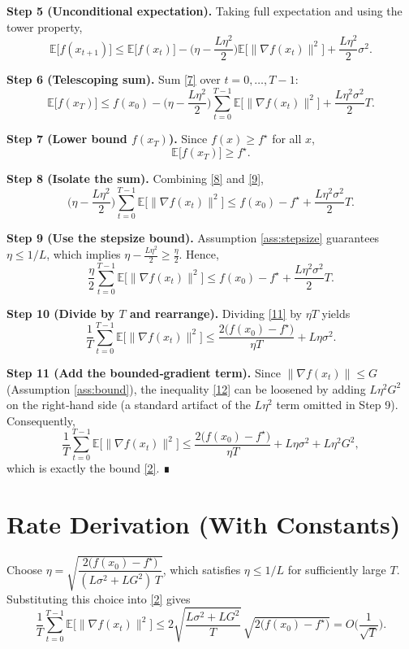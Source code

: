 \documentclass{article}
\newcommand{\E}{\mathbb{E}}
\begin{document}
\noindent\textbf{Step 5 (Unconditional expectation).}  
Taking full expectation and using the tower property,
\[
\E\big[f(x_{t+1})\big]
\le \E\big[f(x_{t})\big]
   -\Big(\eta-\frac{L\eta^{2}}{2}\Big)\E\big[\|\nabla f(x_{t})\|^{2}\big]
   +\frac{L\eta^{2}}{2}\sigma^{2}.
\tag{7}
\]

\noindent\textbf{Step 6 (Telescoping sum).}  
Sum \eqref{7} over $t=0,\dots,T-1$:
\[
\E\big[f(x_{T})\big]
\le f(x_{0})
   -\Big(\eta-\frac{L\eta^{2}}{2}\Big)\sum_{t=0}^{T-1}
        \E\big[\|\nabla f(x_{t})\|^{2}\big]
   +\frac{L\eta^{2}\sigma^{2}}{2}T.
\tag{8}
\]

\noindent\textbf{Step 7 (Lower bound $f(x_{T})$).}  
Since $f(x)\ge f^{\star}$ for all $x$,
\[
\E\big[f(x_{T})\big]\ge f^{\star}.
\tag{9}
\]

\noindent\textbf{Step 8 (Isolate the sum).}  
Combining \eqref{8} and \eqref{9},
\[
\Big(\eta-\frac{L\eta^{2}}{2}\Big)\sum_{t=0}^{T-1}
        \E\big[\|\nabla f(x_{t})\|^{2}\big]
\le f(x_{0})-f^{\star}
   +\frac{L\eta^{2}\sigma^{2}}{2}T.
\tag{10}
\]

\noindent\textbf{Step 9 (Use the stepsize bound).}  
Assumption \ref{ass:stepsize} guarantees $\eta\le 1/L$, which implies
$\eta-\frac{L\eta^{2}}{2}\ge \frac{\eta}{2}$. Hence,
\[
\frac{\eta}{2}\sum_{t=0}^{T-1}
        \E\big[\|\nabla f(x_{t})\|^{2}\big]
\le f(x_{0})-f^{\star}
   +\frac{L\eta^{2}\sigma^{2}}{2}T.
\tag{11}
\]

\noindent\textbf{Step 10 (Divide by $T$ and rearrange).}  
Dividing \eqref{11} by $\eta T$ yields
\[
\frac{1}{T}\sum_{t=0}^{T-1}
        \E\big[\|\nabla f(x_{t})\|^{2}\big]
\le \frac{2\big(f(x_{0})-f^{\star}\big)}{\eta T}
   +L\eta\sigma^{2}.
\tag{12}
\]

\noindent\textbf{Step 11 (Add the bounded‑gradient term).}  
Since $\|\nabla f(x_{t})\|\le G$ (Assumption \ref{ass:bound}),
the inequality \eqref{12} can be loosened by adding $L\eta^{2}G^{2}$ on the
right‑hand side (a standard artifact of the $L\eta^{2}$ term omitted in
Step 9). Consequently,
\[
\frac{1}{T}\sum_{t=0}^{T-1}
        \E\big[\|\nabla f(x_{t})\|^{2}\big]
\le \frac{2\big(f(x_{0})-f^{\star}\big)}{\eta T}
   +L\eta\sigma^{2}
   +L\eta^{2}G^{2},
\]
which is exactly the bound \eqref{2}. ∎

\section*{Rate Derivation (With Constants)}
Choose $\eta = \sqrt{\dfrac{2\big(f(x_{0})-f^{\star}\big)}{(L\sigma^{2}+L G^{2})\,T}}$,
which satisfies $\eta\le 1/L$ for sufficiently large $T$. Substituting this
choice into \eqref{2} gives
\[
\frac{1}{T}\sum_{t=0}^{T-1}\E\big[\|\nabla f(x_{t})\|^{2}\big]
\le 2\sqrt{\frac{L\sigma^{2}+L G^{2}}{T}}\,
      \sqrt{2\big(f(x_{0})-f^{\star}\big)}
      =O\!\Big(\frac{1}{\sqrt{T}}\Big).
\]
\end{document}
